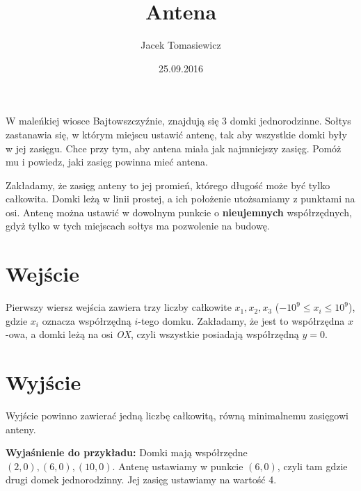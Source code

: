 \documentclass[zad,zawodnik,utf8]{sinol}
\title{Antena}
\author{Jacek Tomasiewicz}
\date{25.09.2016}
\begin{document}
  \begin{tasktext}%
W maleńkiej wiosce Bajtowszczyźnie, znajdują się 3 domki jednorodzinne. Sołtys zastanawia się, w którym miejscu ustawić antenę, tak aby wszystkie domki były w jej zasięgu. Chce przy tym, aby antena miała jak najmniejszy zasięg. Pomóż mu i powiedz, jaki zasięg powinna mieć antena.

Zakładamy, że zasięg anteny to jej promień, którego długość może być tylko całkowita. Domki leżą w linii prostej, a ich położenie utożsamiamy z punktami na osi. Antenę można ustawić w dowolnym punkcie o \textbf{nieujemnych} współrzędnych, gdyż tylko w tych miejscach sołtys ma pozwolenie na budowę.

  \section{Wejście}
Pierwszy wiersz wejścia zawiera trzy liczby całkowite $x_1, x_2, x_3$ ($-10^9 \leq x_i \leq 10^9$), gdzie $x_i$ oznacza współrzędną $i$-tego domku. Zakładamy, że jest to współrzędna $x$-owa, a domki leżą na osi \textit{OX}, czyli wszystkie posiadają współrzędną $y = 0$.

  \section{Wyjście}
Wyjście powinno zawierać jedną liczbę całkowitą, równą minimalnemu zasięgowi anteny.

     \makecompactexample

  \medskip
  \noindent
  \textbf{Wyjaśnienie do przykładu:} 
Domki mają współrzędne $(2, 0), (6, 0), (10, 0)$. Antenę ustawiamy w punkcie $(6,0)$, czyli tam gdzie drugi domek jednorodzinny. Jej zasięg ustawiamy na wartość 4.

  \end{tasktext}
\end{document}
